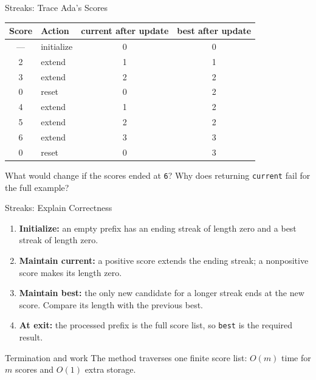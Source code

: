 \documentclass[aspectratio=169,10pt]{beamer}
\begin{document}
\begin{frame}{Streaks: Trace Ada's Scores}
\small
\begin{center}
\begin{tabular}{clcc}
\textbf{Score} & \textbf{Action} & \textbf{current after update} & \textbf{best after update}\\\hline
--- & initialize & 0 & 0\\
2 & extend & 1 & 1\\
3 & extend & 2 & 2\\
0 & reset & 0 & 2\\
4 & extend & 1 & 2\\
5 & extend & 2 & 2\\
6 & extend & 3 & 3\\
0 & reset & 0 & 3
\end{tabular}
\end{center}
\begin{activity}What would change if the scores ended at \texttt{6}? Why does returning \texttt{current} fail for the full example?\end{activity}
\end{frame}

\begin{frame}{Streaks: Explain Correctness}
\small
\begin{enumerate}
 \item \textbf{Initialize:} an empty prefix has an ending streak of length zero and a best streak of length zero.
 \item \textbf{Maintain current:} a positive score extends the ending streak; a nonpositive score makes its length zero.
 \item \textbf{Maintain best:} the only new candidate for a longer streak ends at the new score. Compare its length with the previous best.
 \item \textbf{At exit:} the processed prefix is the full score list, so \texttt{best} is the required result.
\end{enumerate}
\begin{block}{Termination and work}
The method traverses one finite score list: $O(m)$ time for $m$ scores and $O(1)$ extra storage.
\end{block}
\end{frame}
\end{document}
